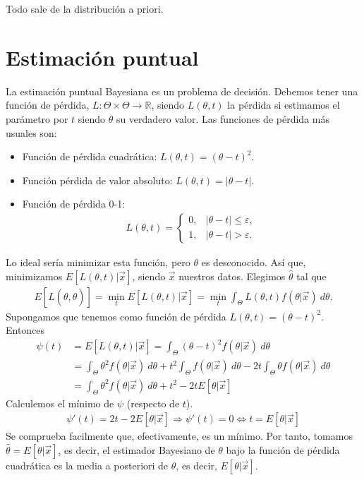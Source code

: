 \begin{tcolorbox}[title=Regla de Oro]
    Todo sale de la distribución a priori.
\end{tcolorbox}

\section{Estimación puntual}
La estimación puntual Bayesiana es un problema de decisión. Debemos tener una función de pérdida, $L : \Theta \times \Theta \longrightarrow \mathbb{R}$, siendo $L(\theta,t)$ la pérdida si estimamos el parámetro por $t$ siendo $\theta$ su verdadero valor. Las funciones de pérdida más usuales son:
\begin{itemize}
    \item Función de pérdida cuadrática: $L(\theta,t) = (\theta - t)^2$.
    \item Función pérdida de valor absoluto: $L(\theta,t) = |\theta - t|$.
    \item Función de pérdida 0-1:
          \begin{align*}
              L(\theta,t) = \begin{cases}
                                0, & |\theta - t| \leq \varepsilon, \\
                                1, & |\theta - t| > \varepsilon.
                            \end{cases}
          \end{align*}
\end{itemize}
Lo ideal sería minimizar esta función, pero $\theta$ es desconocido. Así que, minimizamos $E[L(\theta,t) | \vec{x}]$, siendo $\vec{x}$ nuestros datos. Elegimos $\widehat{\theta}$ tal que
\begin{align*}
    E[L(\theta, \widehat{\theta})] = \min_{t} E[L(\theta,t) | \vec{x}] = \min_t \int_{\Theta} L(\theta,t) f(\theta | \vec{x}) \ d\theta.
\end{align*}
Supongamos que tenemos como función de pérdida $L(\theta,t) = (\theta - t)^2$. Entonces
\begin{align*}
    \psi(t) & = E[L(\theta,t) | \vec{x}] = \int_{\Theta} (\theta - t)^2 f(\theta | \vec{x}) \ d\theta                                                                          \\
            & = \int_{\Theta} \theta^2 f(\theta | \vec{x}) \ d\theta + t^2 \int_{\Theta} f(\theta | \vec{x}) \ d\theta - 2t \int_{\Theta} \theta f(\theta | \vec{x}) \ d\theta \\
            & = \int_{\Theta} \theta^2 f(\theta | \vec{x}) \ d\theta + t^2 - 2tE[\theta | \vec{x}]
\end{align*}
Calculemos el mínimo de $\psi$ (respecto de $t$).
\begin{align*}
    \psi'(t) = 2t - 2E[\theta | \vec{x}] \Longrightarrow \psi'(t) = 0 \Longleftrightarrow t = E[\theta | \vec{x}]
\end{align*}
Se comprueba facilmente que, efectivamente, es un mínimo. Por tanto, tomamos $\widehat{\theta} = E[\theta | \vec{x}]$, es decir, el estimador Bayesiano de $\theta$ bajo la función de pérdida cuadrática es la media a posteriori de $\theta$, es decir, $E[\theta | \vec{x}]$.

